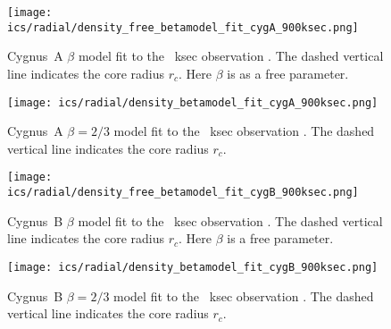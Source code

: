 \documentclass[MScProj_TLRH_ClusterEnergy.tex]{subfiles}
\begin{document}
\begin{figure}[p]
    \centering
    \texttt{[image: ics/radial/density\_free\_betamodel\_fit\_cygA\_900ksec.png]}
    \caption{Cygnus~A $\beta$ model fit to the ~ksec
     observation \citep[in prep]{2016MNRAS.123..456W}. \newline The dashed
    vertical line indicates the core radius $r_c$. Here $\beta$ is as a free parameter.}
    \label{fig:free_betamodel_cygA_900ksec}
    \texttt{[image: ics/radial/density\_betamodel\_fit\_cygA\_900ksec.png]}
    \caption{Cygnus~A $\beta=2/3$ model fit to the ~ksec
     observation \citep[in prep]{2016MNRAS.123..456W}.
    \newline The dashed vertical line indicates the core radius $r_c$.}
    \label{fig:betamodel_cygA_900ksec}
\end{figure}
\begin{figure}[p]
    \centering
    \texttt{[image: ics/radial/density\_free\_betamodel\_fit\_cygB\_900ksec.png]}
    \caption{Cygnus~B $\beta$ model fit to the ~ksec
     observation \citep[in prep]{2016MNRAS.123..456W}. \newline The dashed
    vertical line indicates the core radius $r_c$. Here $\beta$ is a free parameter.}
    \label{fig:free_betamodel_cygB_900ksec}
    \texttt{[image: ics/radial/density\_betamodel\_fit\_cygB\_900ksec.png]}
    \caption{Cygnus~B $\beta=2/3$ model fit to the ~ksec
     observation \citep[in prep]{2016MNRAS.123..456W}. \newline The dashed
    vertical line indicates the core radius $r_c$.}
    \label{fig:betamodel_cygB_900ksec}
\end{figure}
\end{document}
